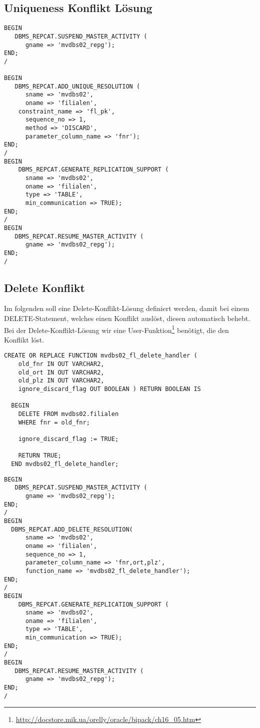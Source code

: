 \documentclass[a4paper,10pt,titlepage=false]{scrreprt}
\begin{document}
\begin{itemize}
\subsection{Uniqueness Konflikt Lösung}
\begin{lstlisting}[style=sql, title=Definition der Uniqueness-Konflikt-Lösung als repadmin auf telesto]
BEGIN
   DBMS_REPCAT.SUSPEND_MASTER_ACTIVITY (
      gname => 'mvdbs02_repg');
END;
/

BEGIN
   DBMS_REPCAT.ADD_UNIQUE_RESOLUTION (
      sname => 'mvdbs02',
      oname => 'filialen',
    constraint_name => 'fl_pk',
      sequence_no => 1,
      method => 'DISCARD',
      parameter_column_name => 'fnr');
END;
/
BEGIN 
    DBMS_REPCAT.GENERATE_REPLICATION_SUPPORT (
      sname => 'mvdbs02',
      oname => 'filialen',
      type => 'TABLE',
      min_communication => TRUE); 
END;
/
BEGIN
   DBMS_REPCAT.RESUME_MASTER_ACTIVITY (
      gname => 'mvdbs02_repg');
END;
/
\end{lstlisting}

\subsection{Delete Konflikt}
Im folgenden soll eine Delete-Konflikt-Lösung definiert werden, damit bei einem DELETE-Statement, welches einen Konflikt auslöst, diesen automatisch behebt. Bei der Delete-Konflikt-Lösung wir eine User-Funktion\footnote{\url{http://docstore.mik.ua/orelly/oracle/bipack/ch16_05.htm}} benötigt, die den Konflikt löst.
\begin{lstlisting}[style=sql, title=Definiton des Konflikt-Lösungs-Handler als repadmin auf telesto]
CREATE OR REPLACE FUNCTION mvdbs02_fl_delete_handler (
    old_fnr IN OUT VARCHAR2,
    old_ort IN OUT VARCHAR2,
    old_plz IN OUT VARCHAR2,
    ignore_discard_flag OUT BOOLEAN ) RETURN BOOLEAN IS

  BEGIN
    DELETE FROM mvdbs02.filialen
    WHERE fnr = old_fnr;

    ignore_discard_flag := TRUE;

    RETURN TRUE;
  END mvdbs02_fl_delete_handler;
\end{lstlisting}

\begin{lstlisting}[style=sql, title=Definiton der Delete-Konflikt-Lösung als repadmin auf telesto]
BEGIN
   DBMS_REPCAT.SUSPEND_MASTER_ACTIVITY (
      gname => 'mvdbs02_repg');
END;
/
BEGIN
  DBMS_REPCAT.ADD_DELETE_RESOLUTION(
      sname => 'mvdbs02',
      oname => 'filialen',
      sequence_no => 1,
      parameter_column_name => 'fnr,ort,plz',
      function_name => 'mvdbs02_fl_delete_handler');
END;
/
BEGIN 
    DBMS_REPCAT.GENERATE_REPLICATION_SUPPORT (
      sname => 'mvdbs02',
      oname => 'filialen',
      type => 'TABLE',
      min_communication => TRUE); 
END;
/
BEGIN
   DBMS_REPCAT.RESUME_MASTER_ACTIVITY (
      gname => 'mvdbs02_repg');
END;
/
\end{lstlisting}


\end{itemize}
\end{document}
